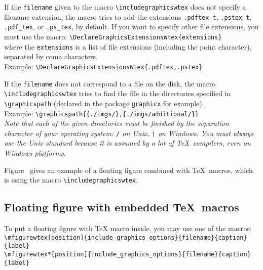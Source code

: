 \documentclass[book,taskpackage,specpackage,codepackage]{upmethodology-document}
\begin{document}
If the \texttt{filename} given to the macro \texttt{{\textbackslash}includegraphicswtex} does not specify a filename extension, the macro tries to add the extensions \texttt{.pdftex\_t}, \texttt{.pstex\_t}, \texttt{.pdf\_tex}, or \texttt{.ps\_tex}, by default. If you want to specify other file extensions, you must use the macro:
\texttt{{\textbackslash}DeclareGraphicsExtensionsWtex\{extensions\}} \\
where the \texttt{extensions} is a list of file extensions (including the point character), separated by coma characters. \\
Example: \texttt{{\textbackslash}DeclareGraphicsExtensionsWtex\{.pdftex,.pstex\}}

If the \texttt{filename} does not correspond to a file on the disk, the macro \texttt{{\textbackslash}includegraphicswtex} tries to find the file in the directories specified in \texttt{{\textbackslash}graphicspath} (declared in the package \texttt{graphicx} for example). \\
Example: \texttt{{\textbackslash}graphicspath\{\{./imgs/\},\{./imgs/additional/\}\}} \\
\emph{Note that each of the given directories must be finished by the separation character of your operating system: \texttt{/} on Unix, \texttt{\textbackslash} on Windows. You must always use the Unix standard because it is assumed by a lot of \TeX\ compilers, even on Windows platforms.}

Figure~ gives an example of a floating figure combined with \TeX\ macros, which is using the macro \texttt{{\textbackslash}includegraphicswtex}.

\subsection{Floating figure with embedded \TeX\ macros}

To put a floating figure with \TeX\xspace macro inside, you may use one of the macros:
\texttt{{\textbackslash}mfigurewtex[position]\{include\_graphics\_options\}\{filename\}\{caption\}\{label\}} \\
\texttt{{\textbackslash}mfigurewtex*[position]\{include\_graphics\_options\}\{filename\}\{caption\}\{label\}}
\end{document}
